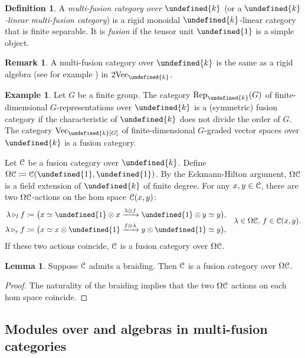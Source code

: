 \documentclass[10pt]{article}
\let\mathbb\undefined
\theoremstyle{definition}
\newtheorem{lem}[thm]{Lemma}
\newtheorem{defn}[thm]{Definition}
\newtheorem{expl}[thm]{Example}
\newtheorem{rem}[thm]{Remark}
\numberwithin{equation}{section}
\numberwithin{thm}{section}
\newcommand{\pf}{\begin{proof}}
\newcommand{\epf}{\end{proof}}
\newcommand{\Rb}{\mathbb{R}}
\newcommand{\bk}{\mathbb{k}}
\newcommand{\CC}{\EuScript{C}}
\newcommand{\one}{\mathbb{1}}
\newcommand{\vect}{\mathrm{Vec}}
\newcommand{\rep}{\mathrm{Rep}}
\begin{document}
\begin{defn}
A \emph{multi-fusion category over $\bk$} (or a \emph{$\bk$-linear multi-fusion category}) is a rigid monoidal $\bk$-linear category that is finite separable. It is \emph{fusion} if the tensor unit $\one$ is a simple object.
\end{defn}

\begin{rem}
A multi-fusion category over $\bk$ is the same as a rigid algebra (see for example \cite{Dec23a}) in $2\vect_\bk$.
\end{rem}

\begin{expl}
Let $G$ be a finite group. The category $\rep_\bk(G)$ of finite-dimensional $G$-representations over $\bk$ is a (symmetric) fusion category if the characteristic of $\bk$ does not divide the order of $G$. The category $\vect_\bk[G]$ of finite-dimensional $G$-graded vector spaces over $\bk$ is a fusion category.
\end{expl}

Let $\CC$ be a fusion category over $\bk$. Define $\Omega \CC \coloneqq \CC(\one,\one)$. By the Eckmann-Hilton argument, $\Omega \CC$ is a field extension of $\bk$ of finite degree. For any $x,y \in \CC$, there are two $\Omega \CC$-actions on the hom space $\CC(x,y)$:
\[
\begin{aligned}
\lambda \triangleright_l f & \coloneqq \bigl( x \simeq \one \otimes x \xrightarrow{\lambda \otimes f} \one \otimes y \simeq y \bigr) , \\
\lambda \triangleright_r f & \coloneqq \bigl( x \simeq x \otimes \one \xrightarrow{f \otimes \lambda} y \otimes \one \simeq y \bigr) ,
\end{aligned} \quad \lambda \in \Omega \CC , \, f \in \CC(x,y) .
\]
If these two actions coincide, $\CC$ is a fusion category over $\Omega \CC$.

\begin{lem} \label{lem_braided_fusion_category_over_Omega}
Suppose $\CC$ admits a braiding. Then $\CC$ is a fusion category over $\Omega \CC$.
\end{lem}

\pf
The naturality of the braiding implies that the two $\Omega \CC$ actions on each hom space coincide.
\epf


\subsection{Modules over and algebras in multi-fusion categories}
\end{document}
